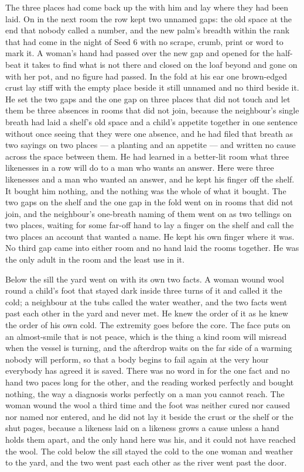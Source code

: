 \scenebreak

The three places had come back up the  with him and lay where they had been laid. On  in the next room the row kept two unnamed gaps: the old space at the end that nobody called a number, and the new palm's breadth within the rank that had come in the night of Seed 6 with no scrape, crumb, print or word to mark it. A woman's hand had passed over the new gap and opened for the half-beat it takes to find what is not there and closed on the loaf beyond and gone on with her pot, and no figure had passed. In the fold at his ear one brown-edged crust lay stiff with the empty place beside it still unnamed and no third beside it. He set the two gaps and the one gap on three places that did not touch and let them be three absences in rooms that did not join, because the neighbour's single breath had laid a shelf's old space and a child's appetite together in one sentence without once seeing that they were one absence, and he had filed that breath as two sayings on two places --- a planting and an appetite --- and written no cause across the space between them. He had learned in a better-lit room what three likenesses in a row will do to a man who wants an answer. Here were three likenesses and a man who wanted an answer, and he kept his finger off the shelf. It bought him nothing, and the nothing was the whole of what it bought. The two gaps on the shelf and the one gap in the fold went on in rooms that did not join, and the neighbour's one-breath naming of them went on as two tellings on two places, waiting for some far-off hand to lay a finger on the shelf and call the two places an account that wanted a name. He kept his own finger where it was. No third gap came into either room and no hand laid the rooms together. He was the only adult in the room and the least use in it.

\scenebreak

Below the sill the yard went on with its own two facts. A woman wound wool round a child's foot that stayed dark inside three turns of it and called it the cold; a neighbour at the tubs called the water weather, and the two facts went past each other in the yard and never met. He knew the order of it as he knew the order of his own cold. The extremity goes before the core. The face puts on an almost-smile that is not peace, which is the thing a kind room will misread when the vessel is turning, and the afterdrop waits on the far side of a warming nobody will perform, so that a body begins to fail again at the very hour everybody has agreed it is saved. There was no word in  for the one fact and no hand two paces long for the other, and the reading worked perfectly and bought nothing, the way a diagnosis works perfectly on a man you cannot reach. The woman wound the wool a third time and the foot was neither cured nor caused nor named nor entered, and he did not lay it beside the crust or the shelf or the shut pages, because a likeness laid on a likeness grows a cause unless a hand holds them apart, and the only hand here was his, and it could not have reached the wool. The cold below the sill stayed the cold to the one woman and weather to the yard, and the two went past each other as the river went past the door.

